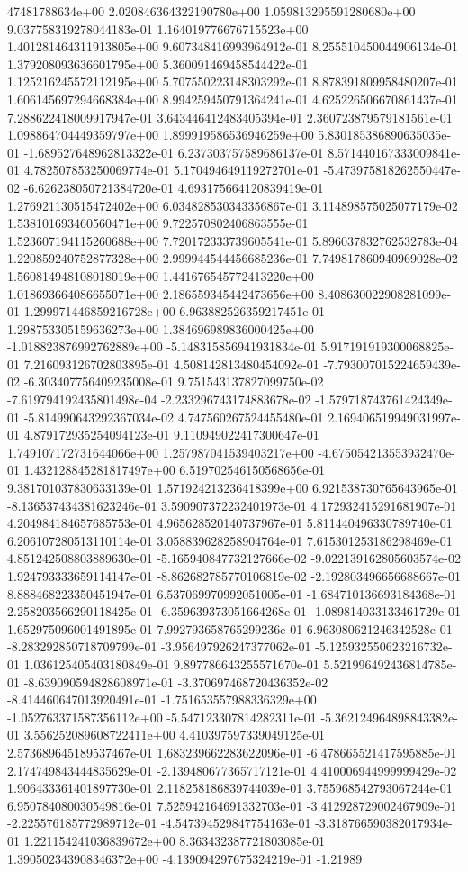 47481788634e+00	2.020846364322190780e+00	1.059813295591280680e+00	9.037758319278044183e-01	1.164019776676715523e+00	1.401281464311913805e+00	9.607348416993964912e-01	8.255510450044906134e-01	1.379208093636601795e+00	5.360091469458544422e-01	1.125216245572112195e+00	5.707550223148303292e-01	8.878391809958480207e-01	1.606145697294668384e+00	8.994259450791364241e-01	4.625226506670861437e-01	7.288622418009917947e-01	3.643446412483405394e-01	2.360723879579181561e-01	1.098864704449359797e+00	1.899919586536946259e+00	5.830185386890635035e-01	-1.689527648962813322e-01	6.237303757589686137e-01	8.571440167333009841e-01	4.782507853250069774e-01	5.170494649119272701e-01	-5.473975818262550447e-02	-6.626238050721384720e-01	4.693175664120839419e-01	1.276921130515472402e+00	6.034828530343356867e-01	3.114898575025077179e-02	1.538101693460560471e+00	9.722570802406863555e-01	1.523607194115260688e+00	7.720172333739605541e-01	5.896037832762532783e-04	1.220859240752877328e+00	2.999944544456685236e-01	7.749817860940969028e-02	1.560814948108018019e+00	1.441676545772413220e+00	1.018693664086655071e+00	2.186559345442473656e+00	8.408630022908281099e-01	1.299971446859216728e+00	6.963882526359217451e-01	1.298753305159636273e+00	1.384696989836000425e+00	-1.018823876992762889e+00	-5.148315856941931834e-01	5.917191919300068825e-01	7.216093126702803895e-01	4.508142813480454092e-01	-7.793007015224659439e-02	-6.303407756409235008e-01	9.751543137827099750e-02	-7.619794192435801498e-04	-2.233296743174883678e-02	-1.579718743761424349e-01	-5.814990643292367034e-02	4.747560267524455480e-01	2.169406519949031997e-01	4.879172935254094123e-01	9.110949022417300647e-01	1.749107172731644066e+00	1.257987041539403217e+00	-4.675054213553932470e-01	1.432128845281817497e+00	6.519702546150568656e-01	9.381701037830633139e-01	1.571924213236418399e+00	6.921538730765643965e-01	-8.136537434381623246e-01	3.590907372232401973e-01	4.172932415291681907e-01	4.204984184657685753e-01	4.965628520140737967e-01	5.811440496330789740e-01	6.206107280513110114e-01	3.058839628258904764e-01	7.615301253186298469e-01	4.851242508803889630e-01	-5.165940847732127666e-02	-9.022139162805603574e-02	1.924793333659114147e-01	-8.862682785770106819e-02	-2.192803496656688667e-01	8.888468223350451947e-01	6.537069970992051005e-01	-1.684710136693184368e-01	2.258203566290118425e-01	-6.359639373051664268e-01	-1.089814033133461729e-01	1.652975096001491895e-01	7.992793658765299236e-01	6.963080621246342528e-01	-8.283292850718709799e-01	-3.956497926247377062e-01	-5.125932550623216732e-01	1.036125405403180849e-01	9.897786643255571670e-01	5.521996492436814785e-01	-8.639090594828608971e-01	-3.370697468720436352e-02	-8.414460647013920491e-01	-1.751653557988336329e+00	-1.052763371587356112e+00	-5.547123307814282311e-01	-5.362124964898843382e-01	3.556252089608722411e+00	4.410397597339049125e-01	2.573689645189537467e-01	1.683239662283622096e-01	-6.478665521417595885e-01	2.174749843444835629e-01	-2.139480677365717121e-01	4.410006944999999429e-02	1.906433361401897730e-01	2.118258186839744039e-01	3.755968542793067244e-01	6.950784080030549816e-01	7.525942164691332703e-01	-3.412928729002467909e-01	-2.225576185772989712e-01	-4.547394529847754163e-01	-3.318766590382017934e-01	1.221154241036839672e+00	8.363432387721803085e-01	1.390502343908346372e+00	-4.139094297675324219e-01	-1.21989